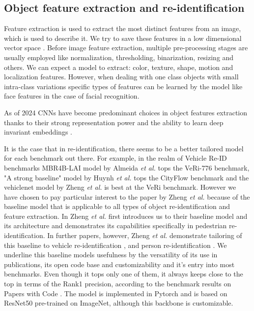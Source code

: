 \documentclass[conference]{IEEEtran} %
\begin{document}
	\subsection{Object feature extraction and re-identification}
	
	Feature extraction is used to extract the most distinct features from an image, which is used to describe it. We try to save these features in a low dimensional vector space \cite{salau2019feature}. Before image feature extraction, multiple pre-processing stages are usually employed like normalization, thresholding, binarization, resizing and others. We can expect a model to extract: color, texture, shape, motion and localization features. However, when dealing with one class objects with small intra-class variations specific types of features can be learned by the model like face features in the case of facial recognition.
	
	As of 2024 CNNs have become predominant choices in object features extraction thanks to their strong representation power and the ability to learn deep invariant embeddings \cite{zheng2019joint}.
	
	It is the case that in re-identification, there seems to be a better tailored model for each benchmark out there. For example, in the realm of Vehicle Re-ID benchmarks MBR4B-LAI model by Almeida \textit{et al.} \cite{almeida2023strength} tops the VeRi-776 benchmark, "A strong baseline" model by Huynh \textit{et al.} \cite{huynh2021strong} tops the CityFlow benchmark and the vehiclenet model by Zheng \textit{et al.} \cite{zheng2019vehiclenet} is best at the VeRi benchmark. However we have chosen to pay particular interest to the paper by Zheng \textit{et al.} because of the baseline model that is applicable to all types of object re-identification and feature extraction. In \cite{zheng2017discriminatively} Zheng \textit{et al.} first introduces us to their baseline model and its architecture and demonstrates its capabilities specifically in pedestrian re-identification. In further papers, however, Zheng \textit{et al.} demonstrate tailoring of this baseline to vehicle re-identification \cite{zheng2019vehiclenet}, \cite{zheng2020vehiclenet} and person re-identification \cite{zheng2019joint}. We underline this baseline models usefulness by the versatility of its use in publications, its open code base and customizability and it's entry into most benchmarks. Even though it tops only one of them, it always keeps close to the top in terms of the Rank1 precision, according to the benchmark results on Papers with Code \cite{paperswithcode2024reid}. The model is implemented in Pytorch and is based on ResNet50 pre-trained on ImageNet, although this backbone is customizable.
	
\end{document}
